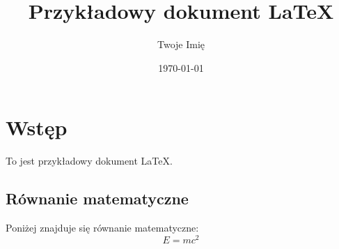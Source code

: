 \documentclass{article}
\title{Przykładowy dokument LaTeX}
\author{Twoje Imię}
\date{\today}
\begin{document}
\maketitle

\section{Wstęp}
To jest przykładowy dokument LaTeX.

\subsection{Równanie matematyczne}
Poniżej znajduje się równanie matematyczne:
\[
E = mc^2
\]
\end{document}
